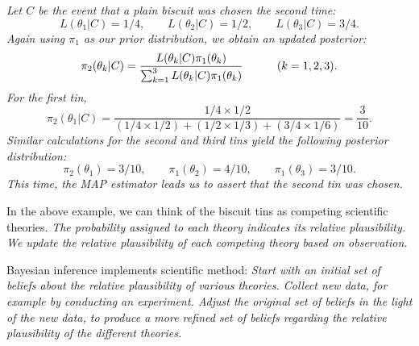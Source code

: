 \begin{solution}
\it %
Let $C$ be the event that a plain biscuit was chosen the second time:
\[
L(\theta_1|C)=1/4,\qquad L(\theta_2|C)=1/2,\qquad L(\theta_3|C)=3/4.
\]
Again using $\pi_1$ as our prior distribution, we obtain an updated posterior:
\[
\pi_2(\theta_k|C) = \frac{L(\theta_k|C)\pi_1(\theta_k)}{\sum_{k=1}^3 L(\theta_k|C)\pi_1(\theta_k)}
\text{\quad\qquad ($k=1,2,3$).}
\]
For the first tin,
\[
\pi_2(\theta_1|C) = \frac{1/4\times 1/2}{(1/4\times 1/2) + (1/2\times 1/3) + (3/4\times 1/6)} = \frac{3}{10}.
\]
Similar calculations for the second and third tins yield the following posterior distribution:
\[
\pi_2(\theta_1) = 3/10,\qquad \pi_1(\theta_2) = 4/10, \qquad \pi_1(\theta_3) = 3/10.
\]
This time, the MAP estimator leads us to assert that the second tin was chosen.
\een
\end{solution}


\begin{remark}
\mbox{}\par
In the above example, we can think of the biscuit tins as competing scientific theories. 
\bit
\it The probability assigned to each theory indicates its \emph{relative plausibility}.
\it We update the relative plausibility of each competing theory based on \emph{observation}.
\eit

\vspace*{2ex}
Bayesian inference implements scientific method:
\ben
\it Start with an initial set of beliefs about the relative plausibility of various theories.
\it Collect new data, for example by conducting an experiment.
\it Adjust the original set of beliefs in the light of the new data, to produce a more refined set of beliefs regarding the relative plausibility of the different theories. 
\een
\end{remark}

\stopcontents[chapters]
\endinput

